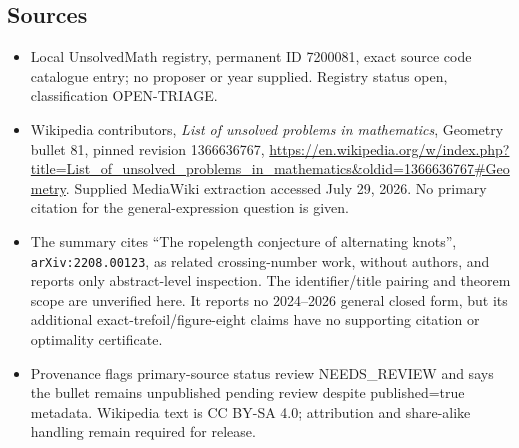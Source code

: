 \documentclass[11pt]{article}
\begin{document}
\subsection{Sources}
\begin{itemize}
\item Local UnsolvedMath registry, permanent ID 7200081, exact source code catalogue entry; no proposer or year supplied. Registry status open, classification OPEN-TRIAGE.
\item Wikipedia contributors, \emph{List of unsolved problems in mathematics}, Geometry bullet 81, pinned revision 1366636767, \url{https://en.wikipedia.org/w/index.php?title=List_of_unsolved_problems_in_mathematics&oldid=1366636767#Geometry}. Supplied MediaWiki extraction accessed July 29, 2026. No primary citation for the general-expression question is given.
\item The summary cites ``The ropelength conjecture of alternating knots'', \texttt{arXiv:2208.00123}, as related crossing-number work, without authors, and reports only abstract-level inspection. The identifier/title pairing and theorem scope are unverified here. It reports no 2024--2026 general closed form, but its additional exact-trefoil/figure-eight claims have no supporting citation or optimality certificate.
\item Provenance flags primary-source status review NEEDS\_REVIEW and says the bullet remains unpublished pending review despite published=true metadata. Wikipedia text is CC BY-SA 4.0; attribution and share-alike handling remain required for release.
\end{itemize}
\end{document}

